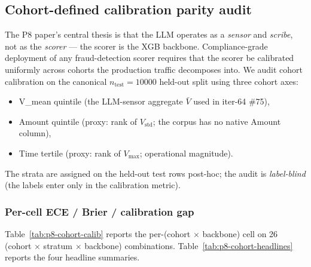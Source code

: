 \subsection{Cohort-defined calibration parity audit}
\label{sec:p8-cohort-calibration-parity}

The P8 paper's central thesis is that the LLM operates as a \emph{sensor} and
\emph{scribe}, not as the \emph{scorer} --- the scorer is the XGB backbone.
Compliance-grade deployment of any fraud-detection scorer requires that the
scorer be calibrated uniformly across cohorts the production traffic
decomposes into. We audit cohort calibration on the canonical
$\mathit{n}_{\text{test}}=10000$ held-out split using three cohort axes:
\begin{itemize}
\item V\_mean quintile (the LLM-sensor aggregate $\bar V$ used in iter-64 \#75),
\item Amount quintile (proxy: rank of $V_{\text{std}}$; the corpus has no
      native Amount column),
\item Time tertile (proxy: rank of $V_{\max}$; operational magnitude).
\end{itemize}
The strata are assigned on the held-out test rows post-hoc; the audit is
\emph{label-blind} (the labels enter only in the calibration metric).

\subsubsection{Per-cell ECE / Brier / calibration gap}
Table~\ref{tab:p8-cohort-calib} reports the per-(cohort $\times$ backbone)
cell on 26 (cohort $\times$ stratum $\times$ backbone) combinations.
Table~\ref{tab:p8-cohort-headlines} reports the four headline summaries.

